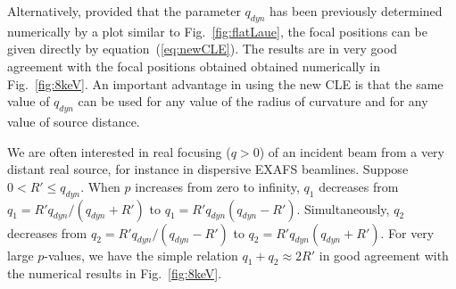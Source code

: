 \documentclass[preprint]{iucr}              %
\begin{document}
Alternatively, provided that the parameter $q_{dyn}$ has been previously determined numerically by a plot similar to Fig.~\ref{fig:flatLaue}, the focal positions can be given directly by equation~(\ref{eq:newCLE}). The results are in very good agreement with the focal positions obtained obtained numerically in Fig.~\ref{fig:8keV}. An important advantage in using the new CLE is that the same value of $q_{dyn}$ can be used for any value of the radius of curvature and for any value of source distance. 

We are often interested in real focusing ($q>0$) of an incident beam from a very distant real source, for instance in dispersive EXAFS beamlines. 
Suppose $0<R'\le q_{dyn}$. When $p$ increases from zero to infinity, $q_1$ decreases from $q_1=R'q_{dyn}/(q_{dyn}+R')$ to 
$q_1=R' q_{dyn}(q_{dyn}-R')$.
Simultaneously, $q_2$ decreases from $q_2=R'q_{dyn}/(q_{dyn}-R')$ to 
$q_2=R'q_{dyn}(q_{dyn}+R')$.
For very large $p$-values, we have the simple relation $q_1+q_2\approx 2R'$ in good agreement with the numerical results in Fig.~\ref{fig:8keV}.
\end{document}
